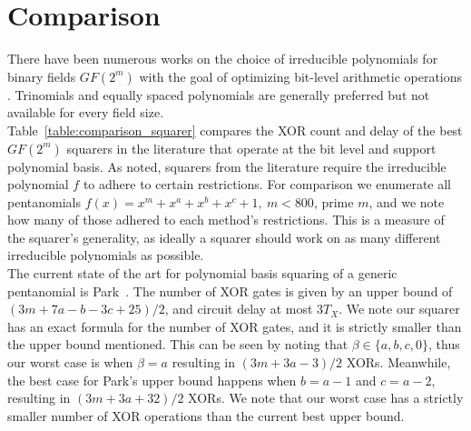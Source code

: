 \section{Comparison} \label{comparison}

There have been numerous works on the choice of irreducible polynomials for binary fields $GF(2^m)$ with the goal of optimizing bit-level arithmetic operations \cite{fan2015survey}. Trinomials and equally spaced polynomials are generally preferred but not available for every field size. \\

Table~\ref{table:comparison_squarer} compares the XOR count and delay of the best $GF(2^m)$ squarers in the literature that operate at the bit level and support polynomial basis. As noted, squarers from the literature require the irreducible polynomial $f$ to adhere to certain restrictions. For comparison we enumerate all pentanomials $f(x) = x^m + x^a + x^b + x^c + 1,~m < 800$, prime $m$, and we note how many of those adhered to each method's restrictions. This is a measure of the squarer's generality, as ideally a squarer should work on as many different irreducible polynomials as possible. \\

The current state of the art for polynomial basis squaring of a generic pentanomial is Park~\cite{park2012explicit}. The number of XOR gates is given by an upper bound of $(3m+7a-b-3c+25)/2$, and circuit delay at most $3T_X$. We note our squarer has an exact formula for the number of XOR gates, and it is strictly smaller than the upper bound mentioned. This can be seen by noting that $\beta \in \{a, b,c, 0\}$, thus our worst case is when $\beta = a$ resulting in $(3m+3a-3)/2$ XORs. Meanwhile, the best case for Park's upper bound happens when $b=a-1$ and $c=a-2$, resulting in $(3m+3a+32)/2$ XORs. We note that our worst case has a strictly smaller number of XOR operations than the current best upper bound.

